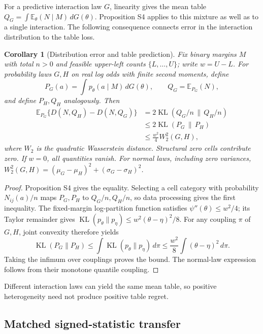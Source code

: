 \documentclass[10pt,a4paper]{article}
\newtheorem{corollary}{Corollary}
\newcommand{\E}{\mathbb{E}}
\begin{document}
For a predictive interaction law $G$, linearity gives the mean table
$Q_G=\int\E_\theta(N\mid M)\,dG(\theta)$. Proposition S4 applies to this
mixture as well as to a single interaction. The following consequence connects
error in the interaction distribution to the table loss.

\begin{corollary}[Distribution error and table prediction]
Fix binary margins $M$ with total $n>0$ and feasible upper-left counts
$\{L,\ldots,U\}$; write $w=U-L$. For probability laws $G,H$ on real log
odds with finite second moments, define
\[
 P_G(a)=\int p_\theta(a\mid M)\,dG(\theta),\qquad Q_G=\E_{P_G}(N),
\]
and define $P_H,Q_H$ analogously. Then
\begin{align*}
 \E_{P_G}\{D(N,Q_H)-D(N,Q_G)\}
 &=2\operatorname{KL}(Q_G/n\,\|\,Q_H/n)\\
 &\leq2\operatorname{KL}(P_G\,\|\,P_H)\\
 &\leq\frac{w^2}{4}W_2^2(G,H),
\end{align*}
where $W_2$ is the quadratic Wasserstein distance. Structural zero cells
contribute zero. If $w=0$, all quantities vanish. For normal laws, including
zero variances, $W_2^2(G,H)=(\mu_G-\mu_H)^2+(\sigma_G-\sigma_H)^2$.
\end{corollary}

\begin{proof}
Proposition S4 gives the equality. Selecting a cell category with probability
$N_{ij}(a)/n$ maps $P_G,P_H$ to $Q_G/n,Q_H/n$, so data processing gives the
first inequality. The fixed-margin log-partition function satisfies
$\psi''(\theta)\leq w^2/4$; its Taylor remainder gives
$\operatorname{KL}(p_\theta\|p_\eta)\leq w^2(\theta-\eta)^2/8$.
For any coupling $\pi$ of $G,H$, joint convexity therefore yields
\[
 \operatorname{KL}(P_G\|P_H)
 \leq\int\operatorname{KL}(p_\theta\|p_\eta)\,d\pi
 \leq\frac{w^2}{8}\int(\theta-\eta)^2\,d\pi.
\]
Taking the infimum over couplings proves the bound. The normal-law expression
follows from their monotone quantile coupling.
\end{proof}

Different interaction laws can yield the same mean table, so positive
heterogeneity need not produce positive table regret.

\subsection{Matched signed-statistic transfer}
\end{document}
